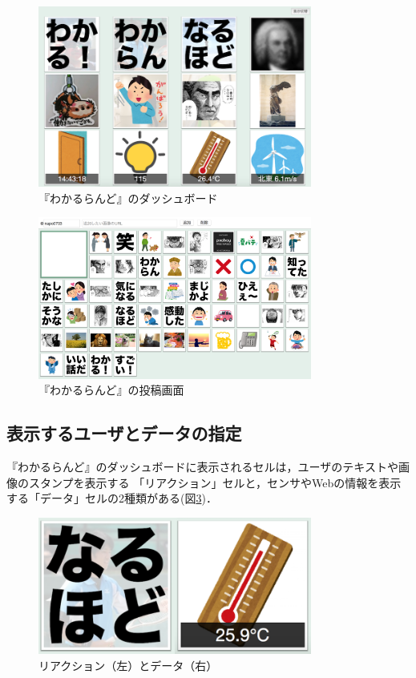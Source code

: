 \begin{figure}[H]
\centering
\includegraphics[width=9cm]{images/dashboard.png}
\caption{『わかるらんど』のダッシュボード}
\label{dashboard}
\end{figure}

\begin{figure}[H]
\centering
\includegraphics[width=9cm]{images/console.png}
\caption{『わかるらんど』の投稿画面}
\label{console}
\end{figure}


\subsection{表示するユーザとデータの指定}

『わかるらんど』のダッシュボードに表示されるセルは，ユーザのテキストや画像のスタンプを表示する
「リアクション」セルと，センサやWebの情報を表示する「データ」セルの2種類がある(図\ref{cell})．

\begin{figure}[H]
\centering
\includegraphics[width=9cm]{images/cell.png}
\caption{リアクション（左）とデータ（右）}
\label{cell}
\end{figure}

